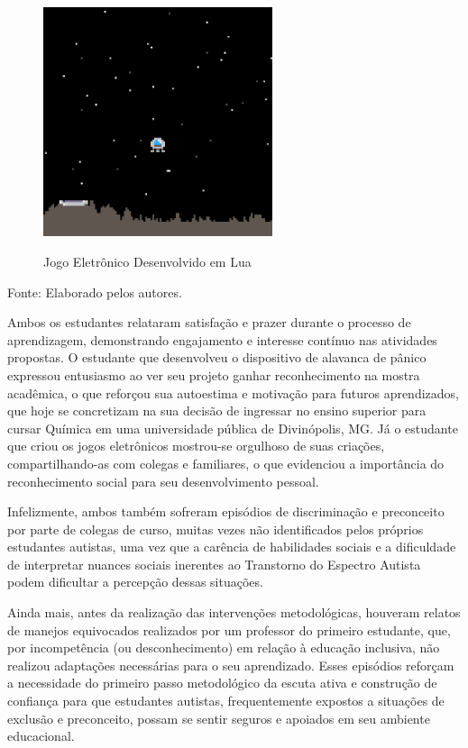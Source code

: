\documentclass[
  12pt,
  a4paper,
]{article}
\newenvironment{Fonte}
  {\par\begin{center}\begingroup\setstretch{1}\small}
  {\par\endgroup\end{center}}
\begin{document}
\begin{figure}[H]
  \centering
  \caption{Jogo Eletrônico Desenvolvido em Lua}
  \includegraphics[width=0.6\textwidth]{images/leojogo2.png}
  \label{fig:leojogo2}
\end{figure}

\begin{Fonte}

Fonte: Elaborado pelos autores.

\end{Fonte}

Ambos os estudantes relataram satisfação e prazer durante o processo de
aprendizagem, demonstrando engajamento e interesse contínuo nas
atividades propostas. O estudante que desenvolveu o dispositivo de
alavanca de pânico expressou entusiasmo ao ver seu projeto ganhar
reconhecimento na mostra acadêmica, o que reforçou sua autoestima e
motivação para futuros aprendizados, que hoje se concretizam na sua
decisão de ingressar no ensino superior para cursar Química em uma
universidade pública de Divinópolis, MG. Já o estudante que criou os
jogos eletrônicos mostrou-se orgulhoso de suas criações,
compartilhando-as com colegas e familiares, o que evidenciou a
importância do reconhecimento social para seu desenvolvimento pessoal.

Infelizmente, ambos também sofreram episódios de discriminação e
preconceito por parte de colegas de curso, muitas vezes não
identificados pelos próprios estudantes autistas, uma vez que a carência
de habilidades sociais e a dificuldade de interpretar nuances sociais
inerentes ao Transtorno do Espectro Autista podem dificultar a percepção
dessas situações.

Ainda mais, antes da realização das intervenções metodológicas, houveram
relatos de manejos equivocados realizados por um professor do primeiro
estudante, que, por incompetência (ou desconhecimento) em relação à
educação inclusiva, não realizou adaptações necessárias para o seu
aprendizado. Esses episódios reforçam a necessidade do primeiro passo
metodológico da escuta ativa e construção de confiança para que
estudantes autistas, frequentemente expostos a situações de exclusão e
preconceito, possam se sentir seguros e apoiados em seu ambiente
educacional.
\end{document}
